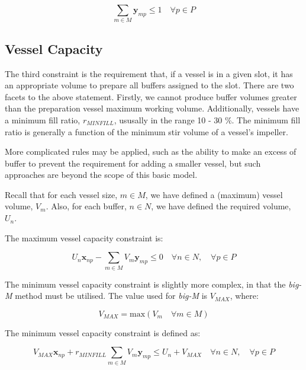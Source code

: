 \begin{equation}
    \sum_{m \in M} \boldsymbol{y}_{mp} \le 1 \quad \forall p \in P
    \label{eq.constr2}
\end{equation}

\subsection{Vessel Capacity}\label{SS.constr3}

The third constraint is the requirement that, if a vessel is in a given slot,
it has an appropriate volume to prepare all buffers assigned to the slot.
There are two facets to the above statement.  
Firstly, we cannot produce buffer volumes greater than the preparation vessel
maximum working volume.  
Additionally, vessels have a minimum fill ratio, $r_{MINFILL}$, ususally in the range 
10 - 30 \%.
The minimum fill ratio is generally a function of the minimum stir volume of a
vessel's impeller.

More complicated rules may be applied, such as the ability to make an excess
of buffer to prevent the requirement for adding a smaller vessel, but such
approaches are beyond the scope of this basic model.

Recall that for each vessel size, $m \in M$, we have defined a (maximum) vessel
volume, $V_{m}$. Also, for each buffer, $n \in N$, we have defined the required
volume, $U_{n}$. 

The maximum vessel capacity constraint is:
        
\begin{equation}
    U_{n} \boldsymbol{x}_{np} - \sum_{m \in M} V_{m} \boldsymbol{y}_{mp} \le 0
    \quad \forall n \in N, \quad \forall p \in P
    \label{eq.constr3a}
\end{equation}

The minimum vessel capacity constraint is slightly more complex, in that the
\emph{big-M} method must be utilised. The value used for \emph{big-M} is
$V_{MAX}$, where:

\begin{equation}
    V_{MAX} = \text{max} \left( V_{m} \quad \forall m \in M \right)
\end{equation}

The minimum vessel capacity constraint is defined as:

\begin{equation}
    V_{MAX} \boldsymbol{x}_{np} + r_{MINFILL} \sum_{m \in M} V_{m} 
    \boldsymbol{y}_{mp} \le U_{n} + V_{MAX} \quad \forall n \in N, \quad
    \forall p \in P
    \label{eq.constr3b}
\end{equation}

